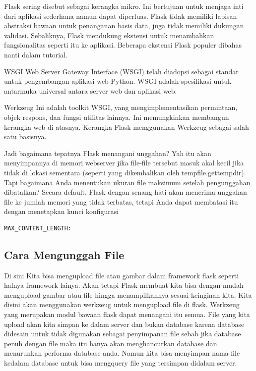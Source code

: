 Flask sering disebut sebagai kerangka mikro. Ini bertujuan untuk menjaga inti dari aplikasi sederhana namun dapat diperluas. Flask tidak memiliki lapisan abstraksi bawaan untuk penanganan basis data, juga tidak memiliki dukungan validasi. Sebaliknya, Flask mendukung ekstensi untuk menambahkan fungsionalitas seperti itu ke aplikasi. Beberapa ekstensi Flask populer dibahas nanti dalam tutorial.

WSGI
Web Server Gateway Interface (WSGI) telah diadopsi sebagai standar untuk pengembangan aplikasi web Python. WSGI adalah spesifikasi untuk antarmuka universal antara server web dan aplikasi web.

Werkzeug
Ini adalah toolkit WSGI, yang mengimplementasikan permintaan, objek respons, dan fungsi utilitas lainnya. Ini memungkinkan membangun kerangka web di atasnya. Kerangka Flask menggunakan Werkzeug sebagai salah satu basisnya.

Jadi bagaimana tepatnya Flask menangani unggahan? Yah itu akan menyimpannya di memori webserver jika file-file tersebut masuk akal kecil jika tidak di lokasi sementara (seperti yang dikembalikan oleh tempfile.gettempdir). Tapi bagaimana Anda menentukan ukuran file maksimum setelah pengunggahan dibatalkan? Secara default, Flask dengan senang hati akan menerima unggahan file ke jumlah memori yang tidak terbatas, tetapi Anda dapat membatasi itu dengan menetapkan kunci konfigurasi 

\begin{verbatim}
MAX_CONTENT_LENGTH:
\end{verbatim}

\subsection{Cara Mengunggah File}


Di sini Kita bisa mengupload file atau gambar dalam framework flask seperti halnya framework lainya. Akan tetapi Flask membuat kita bisa dengan mudah mengupload gambar atau file hingga menampilkannya sesuai keinginan kita. Kita disini akan menggunakan werkzeug untuk mengupload file di flask. Werkzeug yang merupakan modul bawaan flask dapat menangani itu semua.
File yang kita upload akan kita simpan ke dalam server dan bukan database karena database didesain untuk tidak digunakan sebagai penyimpanan file sebab jika database penuh dengan file maka itu hanya akan menghancurkan database dan menurunkan performa database anda. Namun kita bisa menyimpan nama file kedalam database untuk bisa mengquery file yang tersimpan didalam server.

